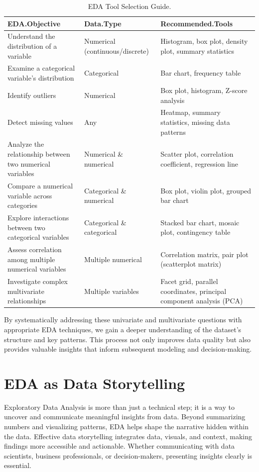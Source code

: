\documentclass[
]{book}
\theoremstyle{definition}
\theoremstyle{definition}
\theoremstyle{definition}
\theoremstyle{definition}
\theoremstyle{remark}
\begin{document}
\begin{table}

\caption{\label{tab:EDA-table-tools}EDA Tool Selection Guide.}
\centering
\begin{tabular}[t]{lll}
\toprule
EDA.Objective & Data.Type & Recommended.Tools\\
\midrule
Understand the distribution of a variable & Numerical (continuous/discrete) & Histogram, box plot, density plot, summary statistics\\
Examine a categorical variable's distribution & Categorical & Bar chart, frequency table\\
Identify outliers & Numerical & Box plot, histogram, Z-score analysis\\
Detect missing values & Any & Heatmap, summary statistics, missing data patterns\\
Analyze the relationship between two numerical variables & Numerical \& numerical & Scatter plot, correlation coefficient, regression line\\
\addlinespace
Compare a numerical variable across categories & Categorical \& numerical & Box plot, violin plot, grouped bar chart\\
Explore interactions between two categorical variables & Categorical \& categorical & Stacked bar chart, mosaic plot, contingency table\\
Assess correlation among multiple numerical variables & Multiple numerical & Correlation matrix, pair plot (scatterplot matrix)\\
Investigate complex multivariate relationships & Multiple variables & Facet grid, parallel coordinates, principal component analysis (PCA)\\
\bottomrule
\end{tabular}
\end{table}

By systematically addressing these univariate and multivariate questions with appropriate EDA techniques, we gain a deeper understanding of the dataset's structure and key patterns. This process not only improves data quality but also provides valuable insights that inform subsequent modeling and decision-making.

\section{EDA as Data Storytelling}\label{eda-as-data-storytelling}

Exploratory Data Analysis is more than just a technical step; it is a way to uncover and communicate meaningful insights from data. Beyond summarizing numbers and visualizing patterns, EDA helps shape the narrative hidden within the data. Effective data storytelling integrates data, visuals, and context, making findings more accessible and actionable. Whether communicating with data scientists, business professionals, or decision-makers, presenting insights clearly is essential.
\end{document}
